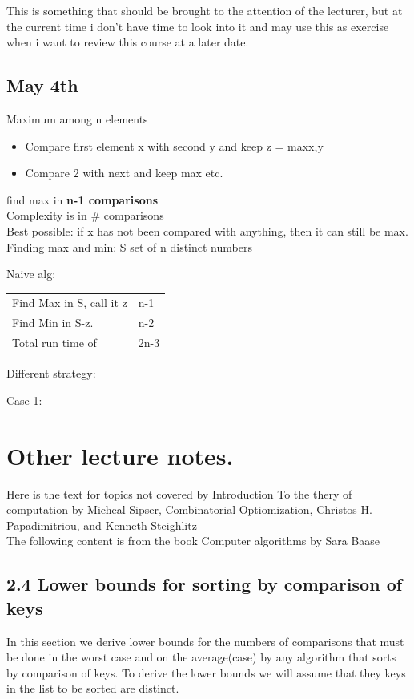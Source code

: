\documentclass[a4paper,10pt,titlepage]{report}
\begin{document}
This is something that should be brought to the attention of the lecturer, but at the current time i don't have time to look into it and may use this as exercise when i want to review this course at a later date.\\
\newpage
\section{May 4th}
Maximum among n elements\\
\begin{itemize}
\item Compare first element x with second y and keep z = max{x,y}
\item Compare 2 with next and keep max etc.
\end{itemize}
find max in \textbf{n-1 comparisons}\\

Complexity is in \# comparisons\\

Best possible: if x has not been compared with anything, then it can still be max.\\

Finding max and min: S set of n distinct numbers\\
\vspace{5mm}

Naive alg:\\
\begin{tabular}{ll}
Find Max in S, call it z & n-1\\
Find Min in S-z. & n-2\\
Total run time of & 2n-3
\end{tabular}

Different strategy:

Case 1:


\chapter{Other lecture notes.}
Here is the text for topics not covered by Introduction To the thery of computation by Micheal Sipser, Combinatorial Optiomization, Christos H. Papadimitriou, and Kenneth Steighlitz\\

The following content is from the book Computer algorithms by Sara Baase\\
\newpage
\section{2.4 Lower bounds for sorting by comparison of keys}
In this section we derive lower bounds for the numbers of comparisons that must be done in the worst case and on the average(case) by any algorithm that sorts by comparison of keys. To derive the lower bounds we will assume that they keys in the list to be sorted are distinct.
\end{document}
